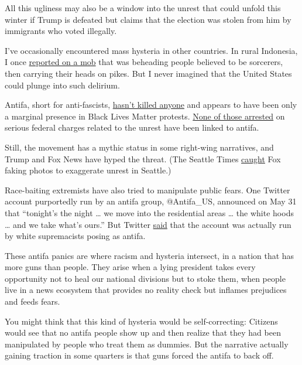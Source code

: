 All this ugliness may also be a window into the unrest that could unfold
this winter if Trump is defeated but claims that the election was stolen
from him by immigrants who voted illegally.

I've occasionally encountered mass hysteria in other countries. In rural
Indonesia, I once
\href{https://www.nytimes3xbfgragh.onion/1998/10/20/world/fears-of-sorcerers-spur-killings-in-java.html}{reported
on a mob} that was beheading people believed to be sorcerers, then
carrying their heads on pikes. But I never imagined that the United
States could plunge into such delirium.

Antifa, short for anti-fascists,
\href{https://www.wbur.org/hereandnow/2020/06/11/what-is-antifa-trump-protests}{hasn't
killed anyone} and appears to have been only a marginal presence in
Black Lives Matter protests.
\href{https://www.nytimes3xbfgragh.onion/2020/06/11/us/antifa-protests-george-floyd.html}{None
of those arrested} on serious federal charges related to the unrest have
been linked to antifa.

Still, the movement has a mythic status in some right-wing narratives,
and Trump and Fox News have hyped the threat. (The Seattle Times
\href{https://www.seattletimes.com/seattle-news/politics/fox-news-runs-digitally-altered-images-in-coverage-of-seattles-protests-capitol-hill-autonomous-zone/}{caught}
Fox faking photos to exaggerate unrest in Seattle.)

Race-baiting extremists have also tried to manipulate public fears. One
Twitter account purportedly run by an antifa group, @Antifa\_US,
announced on May 31 that ``tonight's the night \ldots{} we move into the
residential areas \ldots{} the white hoods \ldots{} and we take what's
ours.'' But Twitter
\href{https://www.cbsnews.com/news/twitter-fake-antifa-acount-white-supremacists-removal/}{said}
that the account was actually run by white supremacists posing as
antifa.

These antifa panics are where racism and hysteria intersect, in a nation
that has more guns than people. They arise when a lying president takes
every opportunity not to heal our national divisions but to stoke them,
when people live in a news ecosystem that provides no reality check but
inflames prejudices and feeds fears.

You might think that this kind of hysteria would be self-correcting:
Citizens would see that no antifa people show up and then realize that
they had been manipulated by people who treat them as dummies. But the
narrative actually gaining traction in some quarters is that guns forced
the antifa to back off.

